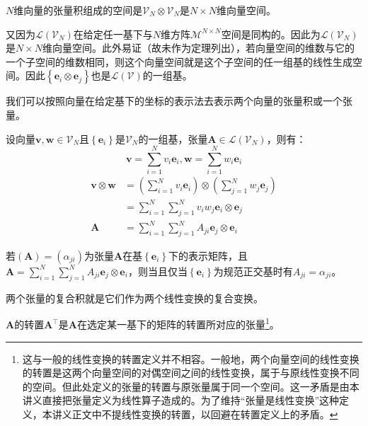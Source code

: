 \documentclass[main.tex]{subfiles}
\begin{document}
\begin{theorem}
$N$维向量的张量积组成的空间是$\mathcal{V}_N\otimes\mathcal{V}_N$是$N\times N$维向量空间。
\end{theorem}

又因为$\mathcal{L}\left(\mathcal{V}_N\right)$在给定任一基下与$N$维方阵$\mathcal{M}^{N\times N}$空间是同构的。因此为$\mathcal{L}\left(\mathcal{V}_N\right)$是$N\times N$维向量空间。此外易证（故未作为定理列出），若向量空间的维数与它的一个子空间的维数相同，则这个向量空间就是这个子空间的任一组基的线性生成空间。因此$\left\{\mathbf{e}_i\otimes\mathbf{e}_j\right\}$也是$\mathcal{L}\left(\mathcal{V}\right)$的一组基。

我们可以按照向量在给定基下的坐标的表示法去表示两个向量的张量积或一个张量。

\begin{example}
设向量$\mathbf{v},\mathbf{w}\in\mathcal{V}_N$且$\left\{\mathbf{e}_i\right\}$是$\mathcal{V}_N$的一组基，张量$\mathbf{A}\in\mathcal{L}\left(\mathcal{V}_N\right)$，则有：
\[\mathbf{v}=\sum_{i=1}^Nv_i\mathbf{e}_i,\mathbf{w}=\sum_{i=1}^Nw_i\mathbf{e}_i\]
\begin{align*}
\mathbf{v}\otimes\mathbf{w}&=\left(\sum_{i=1}^Nv_i\mathbf{e}_i\right)\otimes\left(\sum_{j=1}^Nw_j\mathbf{e}_j\right)\\&=\sum_{i=1}^N\sum_{j=1}^Nv_iw_j\mathbf{e}_i\otimes\mathbf{e}_j\\
\mathbf{A}&=\sum_{i=1}^N\sum_{j=1}^NA_{ji}\mathbf{e}_j\otimes\mathbf{e}_i
\end{align*}

若$\left(\mathbf{A}\right)=\left(\alpha_{ji}\right)$为张量$\mathbf{A}$在基$\left\{\mathbf{e}_i\right\}$下的表示矩阵，且$\mathbf{A}=\sum_{i=1}^N\sum_{j=1}^NA_{ji}\mathbf{e}_j\otimes\mathbf{e}_i$，则当且仅当$\left\{\mathbf{e}_i\right\}$为规范正交基时有$A_{ji}=\alpha_{ji}$。
\end{example}

\begin{definition}
两个张量的复合积就是它们作为两个线性变换的复合变换。
\end{definition}

\begin{definition}[张量的转置]
$\mathbf{A}$的转置$\mathbf{A}^\intercal$是$\mathbf{A}$在选定某一基下的矩阵的转置所对应的张量\footnote{这与一般的线性变换的转置定义并不相容。一般地，两个向量空间的线性变换的转置是这两个向量空间的对偶空间之间的线性变换，属于与原线性变换不同的空间。但此处定义的张量的转置与原张量属于同一个空间。这一矛盾是由本讲义直接把张量定义为线性算子造成的。为了维持“张量是线性变换”这种定义，本讲义正文中不提线性变换的转置，以回避在转置定义上的矛盾。}。
\end{definition}
\end{document}
